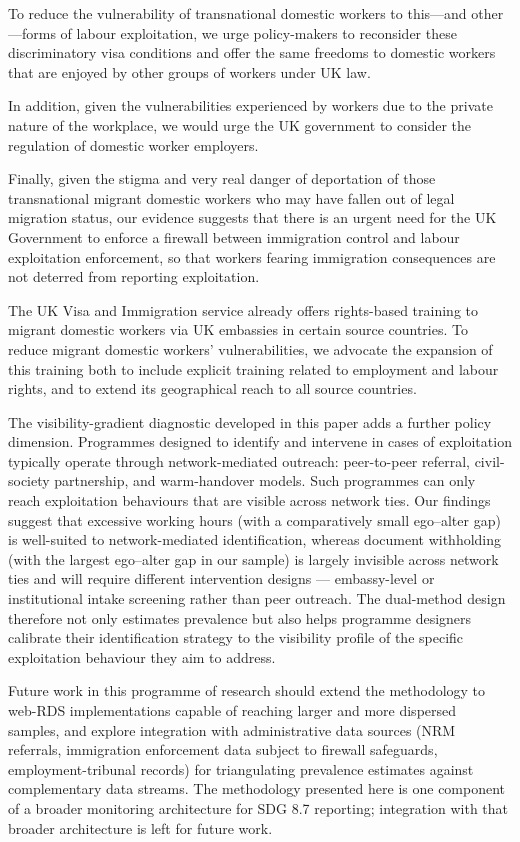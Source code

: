 \documentclass[
  12pt,
  letterpaper,
  DIV=11,
  numbers=noendperiod]{scrartcl}
\begin{document}
To reduce the vulnerability of transnational domestic workers to
this---and other---forms of labour exploitation, we urge policy-makers
to reconsider these discriminatory visa conditions and offer the same
freedoms to domestic workers that are enjoyed by other groups of workers
under UK law.

In addition, given the vulnerabilities experienced by workers due to the
private nature of the workplace, we would urge the UK government to
consider the regulation of domestic worker employers.

Finally, given the stigma and very real danger of deportation of those
transnational migrant domestic workers who may have fallen out of legal
migration status, our evidence suggests that there is an urgent need for
the UK Government to enforce a firewall between immigration control and
labour exploitation enforcement, so that workers fearing immigration
consequences are not deterred from reporting exploitation.

The UK Visa and Immigration service already offers rights-based training
to migrant domestic workers via UK embassies in certain source
countries. To reduce migrant domestic workers' vulnerabilities, we
advocate the expansion of this training both to include explicit
training related to employment and labour rights, and to extend its
geographical reach to all source countries.

The visibility-gradient diagnostic developed in this paper adds a
further policy dimension. Programmes designed to identify and intervene
in cases of exploitation typically operate through network-mediated
outreach: peer-to-peer referral, civil-society partnership, and
warm-handover models. Such programmes can only reach exploitation
behaviours that are visible across network ties. Our findings suggest
that excessive working hours (with a comparatively small ego--alter gap)
is well-suited to network-mediated identification, whereas document
withholding (with the largest ego--alter gap in our sample) is largely
invisible across network ties and will require different intervention
designs --- embassy-level or institutional intake screening rather than
peer outreach. The dual-method design therefore not only estimates
prevalence but also helps programme designers calibrate their
identification strategy to the visibility profile of the specific
exploitation behaviour they aim to address.

Future work in this programme of research should extend the methodology
to web-RDS implementations capable of reaching larger and more dispersed
samples, and explore integration with administrative data sources (NRM
referrals, immigration enforcement data subject to firewall safeguards,
employment-tribunal records) for triangulating prevalence estimates
against complementary data streams. The methodology presented here is
one component of a broader monitoring architecture for SDG 8.7
reporting; integration with that broader architecture is left for future
work.
\end{document}
